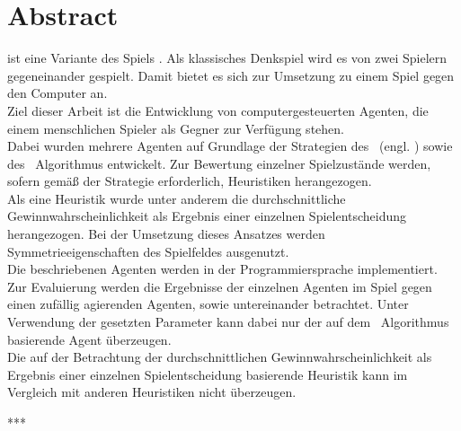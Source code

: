 \chapter*{Abstract}
\authormax
\mxZitat{\ot} ist eine Variante des Spiels . Als klassisches Denkspiel wird es von zwei Spielern gegeneinander gespielt. Damit bietet es sich zur Umsetzung zu einem Spiel gegen den Computer an.
\\Ziel dieser Arbeit ist die Entwicklung von computergesteuerten Agenten, die einem menschlichen Spieler als Gegner zur Verfügung stehen.
\\Dabei wurden mehrere Agenten auf Grundlage der Strategien des \abab\ (engl. \mxZitat{\abp}) sowie des \mc\ Algorithmus entwickelt. Zur Bewertung einzelner Spielzustände werden, sofern gemäß der Strategie erforderlich, Heuristiken herangezogen.
\\Als eine Heuristik wurde unter anderem die durchschnittliche Gewinnwahrscheinlichkeit als Ergebnis einer einzelnen Spielentscheidung herangezogen. Bei der Umsetzung dieses Ansatzes werden Symmetrieeigenschaften des Spielfeldes ausgenutzt.
\\Die beschriebenen Agenten werden in der Programmiersprache  implementiert.
\\Zur Evaluierung werden die Ergebnisse der einzelnen Agenten im Spiel gegen einen zufällig agierenden Agenten, sowie untereinander betrachtet. Unter Verwendung der gesetzten Parameter kann dabei nur der auf dem \mc\ Algorithmus basierende Agent überzeugen.
\\Die auf der Betrachtung der durchschnittlichen Gewinnwahrscheinlichkeit als Ergebnis einer einzelnen Spielentscheidung basierende Heuristik kann im Vergleich mit anderen Heuristiken nicht überzeugen.

\begin{center}
***
\end{center}